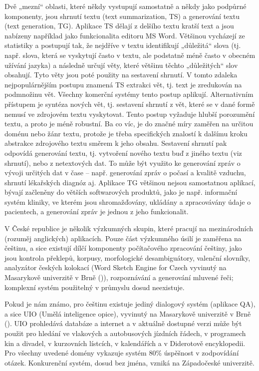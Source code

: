 \begin{multicols}{2}
Dvě „mezní“ oblasti, které někdy vystupují samostatně a někdy jako podpůrné komponenty, jsou shrnutí textu (text summarization, TS) a generování textu (text generation, TG). Aplikace TS dělají z delšího textu kratší text a jsou nabízeny například jako funkcionalita editoru MS Word. Většinou vycházejí ze statistiky a postupují tak, že nejdříve v textu identifikují „důležitá“ slova (tj. např. slova, která se vyskytují často v textu, ale podstatně méně často v obecném užívání jazyka) a následně určují věty, které většinu těchto „důležitých“ slov obsahují. Tyto věty jsou poté použity na sestavení shrnutí. V tomto zdaleka nejpopulárnějším postupu znamená TS extrakci vět, tj. text je zredukován na podmnožinu vět. Všechny komerční systémy tento postup aplikují.
Alternativním přístupem je syntéza nových vět, tj. sestavení shrnutí z vět, které se v dané formě nemusí ve zdrojovém textu vyskytovat. Tento postup vyžaduje hlubší porozumění textu, a proto je méně robustní. Ba co víc, je do značné míry zaměřen na určitou doménu nebo žánr textu, protože je třeba specifických znalostí k dalšímu kroku abstrakce zdrojového textu směrem k jeho obsahu. Sestavení shrnutí pak odpovídá generování textu, tj. vytvoření nového textu buď z jiného textu (viz shrnutí), nebo z netextových dat. To může být využito ke generování zpráv o vývoji určitých dat v čase -- např. generování zpráv o počasí a kvalitě vzduchu, shrnutí lékařských diagnóz aj. Aplikace TG většinou nejsou samostatnou aplikací, bývají začleněny do větších softwarových produktů, jako je např. informační systém kliniky, ve kterém jsou shromažďovány, ukládány a zpracovávány údaje o pacientech, a generování zpráv je jednou z jeho funkcionalit.

V České republice je několik výzkumných skupin, které pracují na mezinárodních (rozuměj anglických) aplikacích. Pouze část výzkumného úsilí je zaměřena na češtinu, a sice existují dílčí komponenty počítačového zpracování češtiny, jako jsou kontrola překlepů, korpusy, morfologické desambiguátory, valenční slovníky, analyzátor českých kolokací (Word Sketch Engine for Czech vyvinutý na Masarykově univerzitě v Brně (\cite{Horak2009})), rozpoznávání a generování mluvené řeči; komplexní systém použitelný v průmyslu dosud neexistuje.

Pokud je nám známo, pro češtinu existuje jediný dialogový systém (aplikace QA), a sice UIO (Umělá inteligence opice), vyvinutý na Masarykově univerzitě v Brně (\cite{Svoboda2003}). UIO prohledává databáze a internet a v aktuálně dostupné verzi může být použit pro hledání ve vlakových a autobusových jízdních řádech, v programech kin a divadel, v kurzovních lístcích, v kalendářích a v Diderotově encyklopedii. Pro všechny uvedené domény vykazuje systém 80\% úspěšnost v zodpovídání otázek. Konkurenční systém, dosud bez jména, vzniká na Západočeské univerzitě.


\end{multicols}
